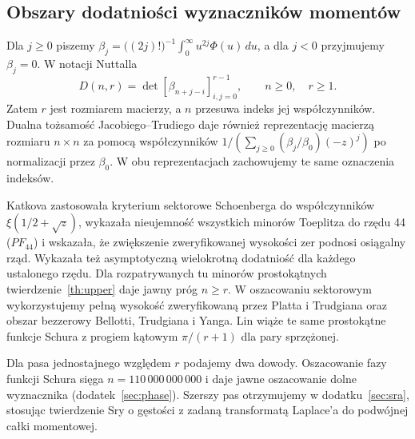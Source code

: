 \documentclass[11pt,a4paper,reqno]{amsart}
\numberwithin{equation}{section}
\begin{document}
\subsection{Obszary dodatniości wyznaczników momentów}\label{sec:dtable}

Dla \(j\ge0\) piszemy \(\beta_j=\big((2j)!\big)^{-1}\int_0^\infty u^{2j}\Phi(u)\,du\), a dla \(j<0\) przyjmujemy \(\beta_j=0\). W notacji Nuttalla
\[ D(n,r)=\det[\beta_{n+j-i}]_{i,j=0}^{r-1},\qquad n\ge0,\quad r\ge1. \]
Zatem \(r\) jest rozmiarem macierzy, a \(n\) przesuwa indeks jej współczynników. Dualna tożsamość Jacobiego--Trudiego daje również reprezentację macierzą rozmiaru \(n\times n\) za pomocą współczynników \(1/(\sum_{j\ge0}(\beta_j/\beta_0)(-z)^j)\) po normalizacji przez \(\beta_0\). W obu reprezentacjach zachowujemy te same oznaczenia indeksów.

Katkova \cite[twierdzenia~1 i~2]{katkova} zastosowała kryterium sektorowe Schoenberga do współczynników \(\xi(1/2+\sqrt z)\), wykazała nieujemność wszystkich minorów Toeplitza do rzędu 44 (\(PF_{44}\)) i wskazała, że zwiększenie zweryfikowanej wysokości zer podnosi osiągalny rząd. Wykazała też asymptotyczną wielokrotną dodatniość dla każdego ustalonego rzędu. Dla rozpatrywanych tu minorów prostokątnych twierdzenie~\ref{th:upper} daje jawny próg \(n\ge r\). W oszacowaniu sektorowym wykorzystujemy pełną wysokość zweryfikowaną przez Platta i Trudgiana oraz obszar bezzerowy Bellotti, Trudgiana i Yanga. Lin \cite{lin} wiąże te same prostokątne funkcje Schura z progiem kątowym \(\pi/(r+1)\) dla pary sprzężonej.

Dla pasa jednostajnego względem \(r\) podajemy dwa dowody. Oszacowanie fazy funkcji Schura sięga \(n=110\,000\,000\,000\) i daje jawne oszacowanie dolne wyznacznika (dodatek~\ref{sec:phase}). Szerszy pas otrzymujemy w dodatku~\ref{sec:sra}, stosując twierdzenie Sry o gęstości z zadaną transformatą Laplace’a \cite[twierdzenie~1.2]{sra} do podwójnej całki momentowej.
\end{document}
